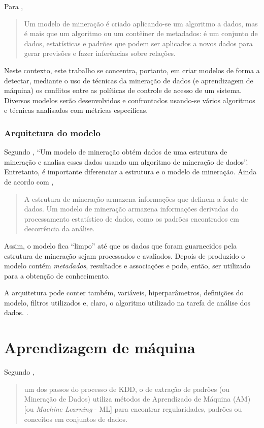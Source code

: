 Para \cite{minewiskan_modelos_nodate}, \begin{quote}
	Um modelo de mineração é criado aplicando-se um algoritmo a dados, mas é mais que um algoritmo ou um contêiner de metadados: é um conjunto de dados, estatísticas e padrões que podem ser aplicados a novos dados para gerar previsões e fazer inferências sobre relações.
\end{quote}

Neste contexto, este trabalho se concentra, portanto, em criar modelos de forma a detectar, mediante o uso de técnicas da mineração de dados (e aprendizagem de máquina) os conflitos entre as políticas de controle de acesso de um sistema. Diversos modelos serão desenvolvidos e confrontados usando-se vários algoritmos e técnicas analisados com métricas específicas.

\subsubsection{Arquitetura do modelo}\label{arquitetura_modelo}

Segundo \cite{minewiskan_modelos_nodate}, ``Um modelo de mineração obtém dados de uma estrutura de mineração e analisa esses dados usando um algoritmo de mineração de dados''. Entretanto, é importante diferenciar a estrutura e o modelo de mineração. Ainda de acordo com \cite{minewiskan_modelos_nodate}, \begin{quote}
	A estrutura de mineração armazena informações que definem a fonte de dados. Um modelo de mineração armazena informações derivadas do processamento estatístico de dados, como os padrões encontrados em decorrência da análise.
\end{quote}

Assim, o modelo fica ``limpo'' até que os dados que foram guarnecidos pela estrutura de mineração sejam processados e avaliados. Depois de produzido o modelo contém \textit{metadados}, resultados e associações e pode, então, ser utilizado para a obtenção de conhecimento.

A arquitetura pode conter também, variáveis, hiperparâmetros, definições do modelo, filtros utilizados e, claro, o algoritmo utilizado na tarefa de análise dos dados. \cite{deep_learning_book_2019}.

\section{Aprendizagem de máquina} \label{aprendizagem_maquina}
Segundo \cite[p. 10]{goldschmidt2005}, \begin{quote}
	um dos passos do processo de KDD, o de extração de padrões (ou Mineração de Dados) utiliza métodos de Aprendizado de Máquina (AM) [ou \textit{Machine Learning} - ML] para encontrar regularidades, padrões ou conceitos em conjuntos de dados.
\end{quote}

